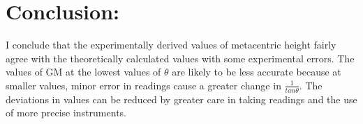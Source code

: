 \documentclass[12pt,a4paper]{article}
\begin{document}
\section{Conclusion:}
I conclude that the experimentally derived values of metacentric height fairly agree with the theoretically calculated values with some experimental errors. The values of GM at the lowest values of $\theta$ are likely to be less accurate because at smaller
values, minor error in readings cause a greater change in $\frac{\text{1}}{\text{$tan \theta$}}$. The deviations in values can be reduced by greater care in taking readings and the use of more precise instruments.
\end{document}
